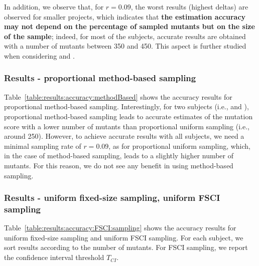 

In addition, we observe that, for $r=0.09$, the worst results (highest deltas) are observed for smaller projects, which indicates that \textbf{the estimation accuracy may not depend on the percentage of sampled mutants but on the size of the sample}; indeed, for most of the subjects, accurate results  are obtained with a number of mutants between 350 and 450. This aspect is further studied when considering   and .

\subsubsection{Results - proportional method-based sampling}

Table~\ref{table:results:accuracy:methodBased} shows the accuracy results for proportional method-based sampling. 
Interestingly, for two subjects (i.e., \GCSP{} and \UTIL{}), proportional method-based sampling leads to accurate estimates of the mutation score with a lower number of mutants than proportional uniform sampling (i.e., around 250).
However, to achieve accurate results with all subjects, we need a minimal sampling rate of $r=0.09$, as for proportional uniform sampling, which, in the case of method-based sampling, leads to a slightly higher number of mutants. For this reason, we do not see any benefit in using method-based sampling.




\subsubsection{Results - uniform fixed-size sampling, uniform FSCI sampling}



Table~\ref{table:results:accuracy:FSCI:sampling} shows the accuracy results for uniform fixed-size sampling and uniform FSCI sampling. For each subject, we sort results according to the number of mutants. For FSCI sampling, we report the confidence interval threshold $T_\mathit{CI}$. 

